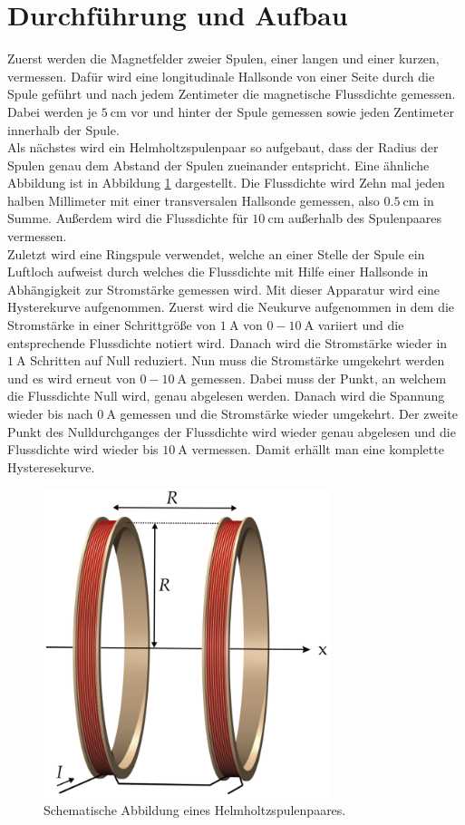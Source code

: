 \section{Durchführung und Aufbau}
\label{sec:Durchführung}
Zuerst werden die Magnetfelder zweier Spulen, einer langen und einer kurzen,
vermessen. Dafür wird eine longitudinale Hallsonde von einer Seite durch die Spule geführt und
nach jedem Zentimeter die magnetische Flussdichte gemessen.
Dabei werden je $\SI{5}{\centi\meter}$ vor und hinter der Spule gemessen sowie
jeden Zentimeter innerhalb der Spule.
\\
Als nächstes wird ein Helmholtzspulenpaar so aufgebaut, dass der Radius der
Spulen genau dem Abstand der Spulen zueinander entspricht.
Eine ähnliche Abbildung ist in Abbildung \ref{fig:helmskizze} dargestellt.
Die Flussdichte wird Zehn mal jeden halben Millimeter mit einer transversalen
Hallsonde gemessen, also
$\SI{0.5}{\centi\meter}$ in Summe. Außerdem wird die Flussdichte für
$\SI{10}{\centi\meter}$ außerhalb des Spulenpaares vermessen.
\\
Zuletzt wird eine Ringspule verwendet, welche an einer Stelle der Spule
ein Luftloch aufweist durch welches die Flussdichte mit Hilfe einer Hallsonde
in Abhängigkeit zur
Stromstärke gemessen wird.
Mit dieser Apparatur wird eine Hysterekurve aufgenommen.
Zuerst wird die Neukurve aufgenommen in dem die Stromstärke in einer
Schrittgröße von $\SI{1}{\ampere}$ von $0 - \SI{10}{\ampere}$ variiert und die
entsprechende Flussdichte notiert wird. Danach wird die Stromstärke wieder in
$\SI{1}{\ampere}$ Schritten auf Null reduziert. Nun muss die Stromstärke
umgekehrt werden und es wird erneut von $0 - \SI{10}{\ampere}$ gemessen. Dabei
muss der Punkt, an welchem die Flussdichte Null wird, genau abgelesen werden.
Danach wird die Spannung wieder bis nach $\SI{0}{\ampere}$ gemessen und die
Stromstärke wieder umgekehrt. Der zweite Punkt des Nulldurchganges der
Flussdichte wird wieder genau abgelesen und die Flussdichte wird wieder bis
$\SI{10}{\ampere}$ vermessen.
Damit erhällt man eine komplette Hysteresekurve.

\begin{figure}
  \includegraphics[height=9cm]{content/helmi.png}
  \caption{Schematische Abbildung eines Helmholtzspulenpaares\cite{Helmskizze}.}
  \label{fig:helmskizze}
\end{figure}
